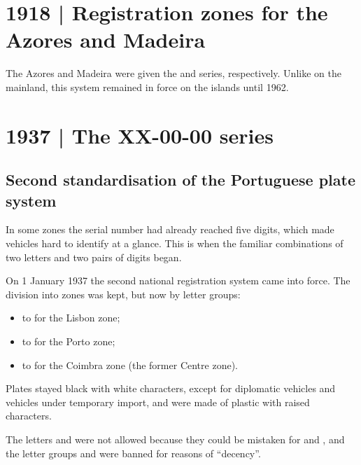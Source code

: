 \section{1918 | Registration zones for the Azores and Madeira}

The Azores and Madeira were given the  and  series,
respectively. Unlike on the mainland, this system remained in force on the
islands until 1962.

\section{1937 | The XX-00-00 series}
\subsection*{Second standardisation of the Portuguese plate system}

In some zones the serial number had already reached five digits, which made
vehicles hard to identify at a glance. This is when the familiar combinations of
two letters and two pairs of digits began.

On 1 January 1937 the second national registration system came into force. The
division into zones was kept, but now by letter groups:
\begin{itemize}
  \item {} to  for the Lisbon zone;
  \item {} to  for the Porto zone;
  \item {} to  for the Coimbra zone (the former Centre zone).
\end{itemize}

Plates stayed black with white characters, except for diplomatic vehicles and
vehicles under temporary import, and were made of plastic with raised
characters.


The letters  and  were not allowed because they could be
mistaken for  and , and the letter groups  and
 were banned for reasons of “decency”.

